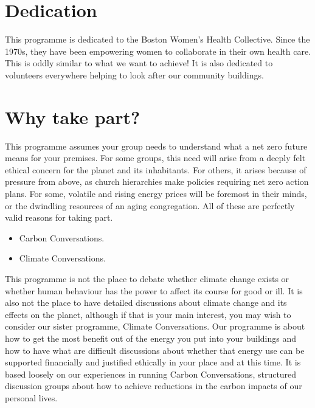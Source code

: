 \documentclass[letterpaper,10pt,english]{jupyterBook}
\begin{document}
\chapter{Dedication}
\label{\detokenize{dedication:dedication}}\label{\detokenize{dedication::doc}}
\sphinxAtStartPar
This programme is dedicated to the Boston Women’s Health Collective.  Since the 1970s, they have been empowering women to collaborate in their own health care.  This is oddly similar to what we want to achieve!  It is also dedicated to volunteers everywhere helping to look after our community buildings.


\chapter{Why take part?}
\label{\detokenize{motivation:why-take-part}}\label{\detokenize{motivation::doc}}
\sphinxAtStartPar
This programme assumes your group needs to understand what a net zero future means for your premises.  For some groups, this need will arise from a deeply felt ethical concern for the planet and its inhabitants.  For others, it arises because of pressure from above, as church hierarchies make policies requiring net zero action plans.  For some, volatile and rising energy prices will be foremost in their minds, or the dwindling resources of an aging congregation.  All of these are perfectly valid reasons for taking part.

\begin{sphinxShadowBox}
\begin{itemize}
\item {} 
\sphinxAtStartPar
Carbon Conversations.  

\item {} 
\sphinxAtStartPar
Climate Conversations. 

\end{itemize}
\end{sphinxShadowBox}

\sphinxAtStartPar
This programme is not the place to debate whether climate change exists or whether human behaviour has the power to affect its course for good or ill.  It is also not the place to have detailed discussions about climate change and its effects on the planet, although if that is your main interest, you may wish to consider our sister programme, Climate Conversations.  Our programme is about how to get the most benefit out of the energy you put into your buildings and how to have what are difficult discussions about whether that energy use can be supported financially and justified ethically in your place and at this time.   It is based loosely on our experiences in running Carbon Conversations, structured discussion groups about how to achieve reductions in the carbon impacts of our personal lives.
\end{document}

